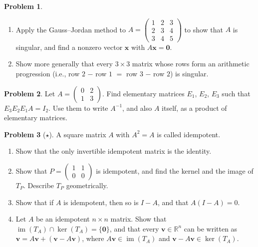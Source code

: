 \documentclass[11pt]{article}
\theoremstyle{definition}
\newtheorem{problem}{Problem}[section]
\DeclareMathOperator{\im}{im}
\begin{document}
\begin{problem}\label{pr:arithmetic}
    \begin{enumerate}[label=(\alph*)]
        \item Apply the Gauss--Jordan method to $A = \begin{pmatrix} 1 & 2 & 3 \\ 2 & 3 & 4 \\ 3 & 4 & 5 \end{pmatrix}$ to show that $A$ is singular, and find a nonzero vector $\mathbf{x}$ with $A\mathbf{x} = \mathbf{0}$.
        \item Show more generally that every $3 \times 3$ matrix whose rows form an arithmetic progression (i.e., row $2$ $-$ row $1$ $=$ row $3$ $-$ row $2$) is singular.
    \end{enumerate}
\end{problem}

\begin{problem}\label{pr:elementary}
    Let $A = \begin{pmatrix} 0 & 2 \\ 1 & 3 \end{pmatrix}$. Find elementary matrices $E_1$, $E_2$, $E_3$ such that $E_3 E_2 E_1 A = I_2$. Use them to write $A^{-1}$, and also $A$ itself, as a product of elementary matrices.
\end{problem}

\begin{problem}[$\star$]\label{pr:idempotent}
    A square matrix $A$ with $A^2 = A$ is called idempotent.
    \begin{enumerate}[label=(\alph*)]
        \item Show that the only invertible idempotent matrix is the identity.
        \item Show that $P = \begin{pmatrix} 1 & 1 \\ 0 & 0 \end{pmatrix}$ is idempotent, and find the kernel and the image of $T_P$. Describe $T_P$ geometrically.
        \item Show that if $A$ is idempotent, then so is $I - A$, and that $A(I - A) = 0$.
        \item Let $A$ be an idempotent $n \times n$ matrix. Show that $\im(T_A) \cap \ker(T_A) = \{\mathbf{0}\}$, and that every $\mathbf{v} \in \mathbb{R}^n$ can be written as $\mathbf{v} = A\mathbf{v} + (\mathbf{v} - A\mathbf{v})$, where $A\mathbf{v} \in \im(T_A)$ and $\mathbf{v} - A\mathbf{v} \in \ker(T_A)$.
    \end{enumerate}
\end{problem}
\end{document}
